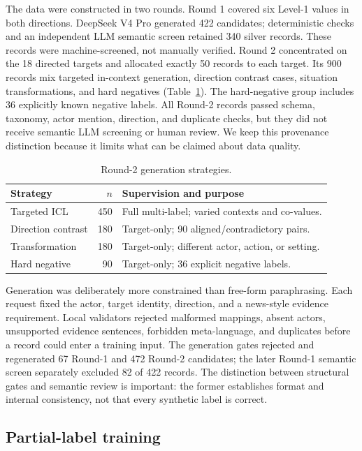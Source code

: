 \documentclass[sigconf,article,a4paper]{acmart}
\begin{document}
The data were constructed in two rounds. Round 1 covered six Level-1 values in
both directions. DeepSeek V4 Pro generated 422 candidates; deterministic checks
and an independent LLM semantic screen retained 340 silver records. These
records were machine-screened, not manually verified. Round 2 concentrated on
the 18 directed targets and allocated exactly 50 records to each target. Its
900 records mix targeted in-context generation, direction contrast cases,
situation transformations, and hard negatives (Table~\ref{tab:generation}).
The hard-negative group includes 36
explicitly known negative labels. All Round-2 records passed schema, taxonomy,
actor mention, direction, and duplicate checks, but they did not receive
semantic LLM screening or human review. We keep this provenance distinction
because it limits what can be claimed about data quality.

\begin{table}[H]
  \caption{Round-2 generation strategies.}
  \label{tab:generation}
  \scriptsize
  \begin{tabularx}{\columnwidth}{@{}XrX@{}}
    \toprule
    Strategy & $n$ & Supervision and purpose \\
    \midrule
    Targeted ICL & 450 & Full multi-label; varied contexts and co-values. \\
    Direction contrast & 180 & Target-only; 90 aligned/contradictory pairs. \\
    Transformation & 180 & Target-only; different actor, action, or setting. \\
    Hard negative & 90 & Target-only; 36 explicit negative labels. \\
    \bottomrule
  \end{tabularx}
\end{table}

Generation was deliberately more constrained than free-form paraphrasing.
Each request fixed the actor, target identity, direction, and a news-style
evidence requirement. Local validators rejected malformed mappings, absent
actors, unsupported evidence sentences, forbidden meta-language, and
duplicates before a record could enter a training input. The generation gates
rejected and regenerated 67 Round-1 and 472 Round-2 candidates; the later
Round-1 semantic screen separately excluded 82 of 422 records. The distinction
between structural gates and semantic review is important: the former
establishes format and internal consistency, not that every synthetic label is
correct.

\subsection{Partial-label training}
\end{document}
